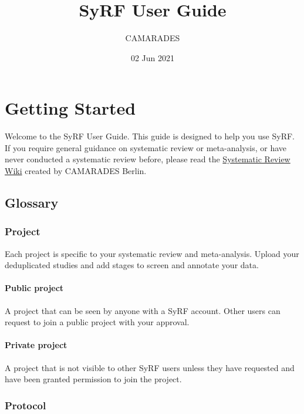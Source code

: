 \documentclass[
]{book}
\title{SyRF User Guide}
\author{CAMARADES}
\date{02 Jun 2021}
\begin{document}
\maketitle

{
\setcounter{tocdepth}{1}
\tableofcontents
}
\hypertarget{index}{%
\chapter{Getting Started}\label{index}}

Welcome to the SyRF User Guide. This guide is designed to help you use SyRF. If you require general guidance on systematic review or meta-analysis, or have never conducted a systematic review before, please read the \href{https://www.camarades.de/}{Systematic Review Wiki} created by CAMARADES Berlin.

\hypertarget{glossary}{%
\section{Glossary}\label{glossary}}

\hypertarget{project}{%
\subsection{Project}\label{project}}

Each project is specific to your systematic review and meta-analysis. Upload your deduplicated studies and add stages to screen and annotate your data.

\hypertarget{public-project}{%
\subsubsection{Public project}\label{public-project}}

A project that can be seen by anyone with a SyRF account. Other users can request to join a public project with your approval.

\hypertarget{private-project}{%
\subsubsection{Private project}\label{private-project}}

A project that is not visible to other SyRF users unless they have requested and have been granted permission to join the project.

\hypertarget{protocol}{%
\subsection{Protocol}\label{protocol}}
\end{document}
